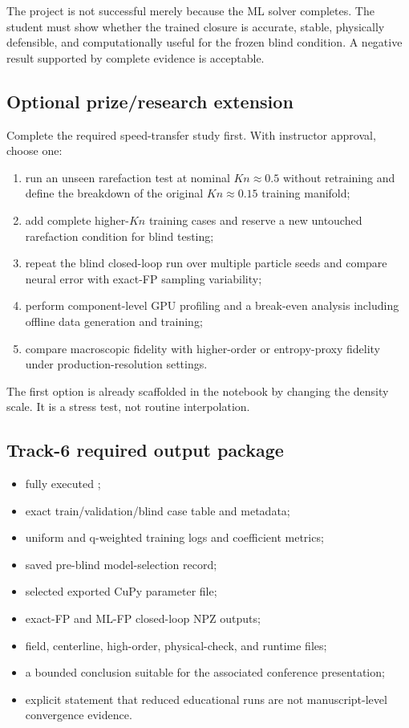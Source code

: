 \documentclass[11pt]{article}
\newcommand{\file}[1]{\path{#1}}
\begin{document}
\begin{failurebox}
The project is not successful merely because the ML solver completes. The student must show whether the trained closure is accurate, stable, physically defensible, and computationally useful for the frozen blind condition. A negative result supported by complete evidence is acceptable.
\end{failurebox}

\subsection{Optional prize/research extension}
Complete the required speed-transfer study first. With instructor approval, choose one:
\begin{enumerate}
\item run an unseen rarefaction test at nominal $Kn\approx0.5$ without retraining and define the breakdown of the original $Kn\approx0.15$ training manifold;
\item add complete higher-$Kn$ training cases and reserve a new untouched rarefaction condition for blind testing;
\item repeat the blind closed-loop run over multiple particle seeds and compare neural error with exact-FP sampling variability;
\item perform component-level GPU profiling and a break-even analysis including offline data generation and training;
\item compare macroscopic fidelity with higher-order or entropy-proxy fidelity under production-resolution settings.
\end{enumerate}
The first option is already scaffolded in the notebook by changing the density scale. It is a stress test, not routine interpolation.

\subsection{Track-6 required output package}
\begin{itemize}
\item fully executed \file{P6_FP_Cavity_Closure.ipynb};
\item exact train/validation/blind case table and metadata;
\item uniform and q-weighted training logs and coefficient metrics;
\item saved pre-blind model-selection record;
\item selected exported CuPy parameter file;
\item exact-FP and ML-FP closed-loop NPZ outputs;
\item field, centerline, high-order, physical-check, and runtime files;
\item a bounded conclusion suitable for the associated conference presentation;
\item explicit statement that reduced educational runs are not manuscript-level convergence evidence.
\end{itemize}
\end{document}
